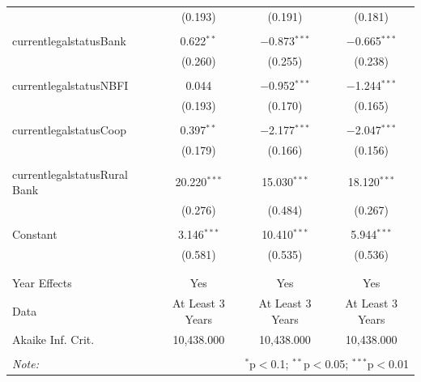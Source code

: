 \documentclass[a4paper, nobind]{templates/ociamthesis}
\begin{document}
\begin{table}[!htbp]
\begin{tabular}{@{\extracolsep{5pt}}lccc}
  & (0.193) & (0.191) & (0.181) \\ 
  & & & \\ 
 currentlegalstatusBank & 0.622$^{**}$ & $-$0.873$^{***}$ & $-$0.665$^{***}$ \\ 
  & (0.260) & (0.255) & (0.238) \\ 
  & & & \\ 
 currentlegalstatusNBFI & 0.044 & $-$0.952$^{***}$ & $-$1.244$^{***}$ \\ 
  & (0.193) & (0.170) & (0.165) \\ 
  & & & \\ 
 currentlegalstatusCoop & 0.397$^{**}$ & $-$2.177$^{***}$ & $-$2.047$^{***}$ \\ 
  & (0.179) & (0.166) & (0.156) \\ 
  & & & \\ 
 currentlegalstatusRural Bank & 20.220$^{***}$ & 15.030$^{***}$ & 18.120$^{***}$ \\ 
  & (0.276) & (0.484) & (0.267) \\ 
  & & & \\ 
 Constant & 3.146$^{***}$ & 10.410$^{***}$ & 5.944$^{***}$ \\ 
  & (0.581) & (0.535) & (0.536) \\ 
  & & & \\ 
\hline \\[-1.8ex] 
Year Effects & Yes & Yes & Yes \\ 
Data & At Least 3 Years & At Least 3 Years & At Least 3 Years \\ 
Akaike Inf. Crit. & 10,438.000 & 10,438.000 & 10,438.000 \\ 
\hline 
\hline \\[-1.8ex] 
\textit{Note:}  & \multicolumn{3}{r}{$^{*}$p$<$0.1; $^{**}$p$<$0.05; $^{***}$p$<$0.01} \\ 
\end{tabular} 
\end{table}

\newpage
\end{document}
